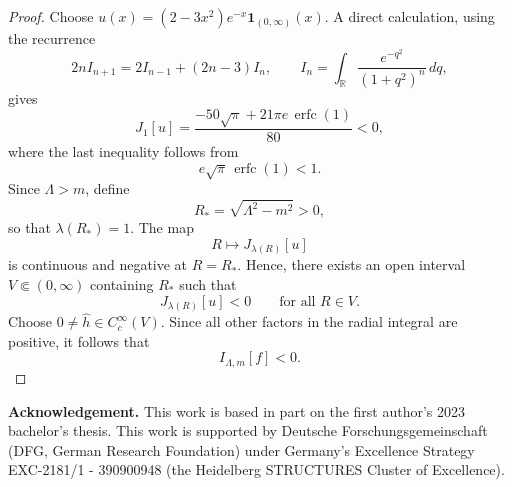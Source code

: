 \documentclass[10pt,a4paper,oneside,reqno]{amsart}
\begin{document}
\begin{appendices}
\begin{proof}
Choose $u(x)=(2-3x^2)e^{-x}\mathbf{1}_{(0,\infty)}(x)$. A direct calculation, using the recurrence
\begin{equation}
    2nI_{n+1}=2I_{n-1}+(2n-3)I_n,
    \qquad
    I_n=\int_{\mathbb{R}}\frac{e^{-q^2}}{(1+q^2)^n}\,dq,
\end{equation}
gives
\begin{equation} 
    J_1[u]
    =
    \frac{-50\sqrt{\pi}+21\pi e\,\operatorname{erfc}(1)}{80}
    <0,
\end{equation}
where the last inequality follows from
\begin{equation}
e\sqrt{\pi}\,\operatorname{erfc}(1)<1.
\end{equation}
Since $\Lambda>m$, define
\begin{equation}
R_*=\sqrt{\Lambda^2-m^2}>0,
\end{equation}
so that $\lambda(R_*)=1$. The map
\begin{equation}
R\longmapsto J_{\lambda(R)}[u]
\end{equation}
is continuous and negative at $R=R_*$. Hence, there exists an open interval $V\Subset(0,\infty)$ containing $R_*$ such that
\begin{equation}
J_{\lambda(R)}[u]<0
\qquad\text{for all }R\in V.
\end{equation}
Choose $0\neq\widehat{h}\in C_c^\infty(V)$. Since all other factors in the radial integral are positive, it follows that
\begin{equation}
I_{\Lambda,m}[f]<0.
\end{equation}
\end{proof}

\end{appendices}

\noindent
{\bf Acknowledgement. } This work is based in part on the first author's 2023 bachelor's thesis. This work is supported by Deutsche Forschungsgemeinschaft (DFG, German Research Foundation) under Germany's Excellence Strategy  EXC-2181/1 - 390900948 (the Heidelberg STRUCTURES Cluster of Excellence). 


\printbibliography
\end{document}
